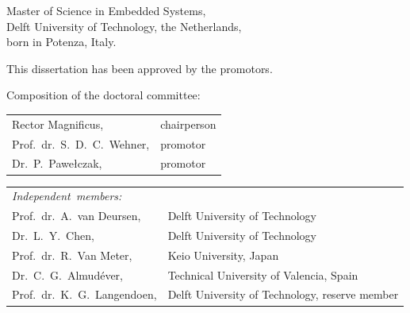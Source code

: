 \begin{titlepage}
\begin{center}
\bigskip
\bigskip

Master of Science in Embedded Systems, \\
Delft University of Technology, the Netherlands, \\
born in Potenza, Italy.

\vspace*{2\bigskipamount}

\end{center}

\clearpage
\thispagestyle{empty}

\noindent
This dissertation has been approved by the promotors.

\bigskip\noindent
Composition of the doctoral committee:

\medskip\noindent
\begin{tabular}{p{4.5cm}l}
    Rector Magnificus, & chairperson \\
    Prof.\ dr.\ S.\ D.\ C.\ Wehner, & promotor \\
    Dr.\ P.\ Pawełczak, & promotor \\
\end{tabular}

\medskip\noindent
\begin{tabular}{p{4.5cm}l}
    \mbox{\emph{Independent members:}} & \\
    Prof.\ dr.\ A.\ van Deursen,    & Delft University of Technology \\
    Dr.\ L.\ Y.\ Chen,              & Delft University of Technology \\
    Prof.\ dr.\ R.\ Van Meter,      & Keio University, Japan \\
    Dr.\ C.\ G.\ Almudéver,         & Technical University of Valencia, Spain \\
    Prof.\ dr.\ K.\ G.\ Langendoen, & Delft University of Technology, reserve member \\
\end{tabular}


\vfill


\end{titlepage}
